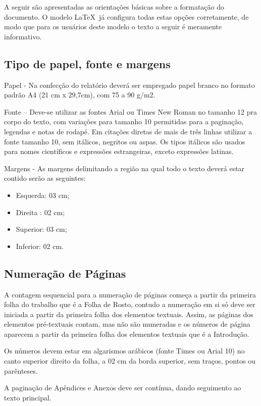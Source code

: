 A seguir são apresentadas as orientações básicas sobre a formatação do
documento. O modelo \LaTeX\ já configura todas estas opções corretamente,
de modo que para os usuários deste modelo o texto a seguir é meramente
informativo.

\subsection{Tipo de papel, fonte e margens}

Papel - Na confecção do relatório deverá ser empregado papel branco no 
formato padrão A4 (21 cm x 29,7cm), com 75 a 90 g/m2.

Fonte – Deve-se utilizar as fontes Arial ou Times New Roman no tamanho 12 
pra corpo do texto, com variações para tamanho 10 permitidas para a 
paginação, legendas e notas de rodapé. Em citações diretas de mais de três 
linhas utilizar a fonte tamanho 10, sem itálicos, negritos ou aspas. Os 
tipos itálicos são usados para nomes científicos e expressões estrangeiras, 
exceto expressões latinas.

Margens - As margens delimitando a região na qual todo o texto deverá estar 
contido serão as seguintes: 

\begin{itemize}
	\item Esquerda: 03 cm;
	\item Direita	: 02 cm;
	\item Superior: 03 cm;
	\item Inferior: 02 cm. 
\end{itemize}

\subsection{Numeração de Páginas}

A contagem sequencial para a numeração de páginas começa a partir da 
primeira folha do trabalho que é a Folha de Rosto, contudo a numeração em 
si só deve ser iniciada a partir da primeira folha dos elementos textuais. 
Assim, as páginas dos elementos pré-textuais contam, mas não são numeradas 
e os números de página aparecem a partir da primeira folha dos elementos 
textuais que é a Introdução. 

Os números devem estar em algarismos arábicos (fonte Times ou Arial 10) no 
canto superior direito da folha, a 02 cm da borda superior, sem traços, 
pontos ou parênteses. 

A paginação de Apêndices e Anexos deve ser contínua, dando seguimento ao 
texto principal.

